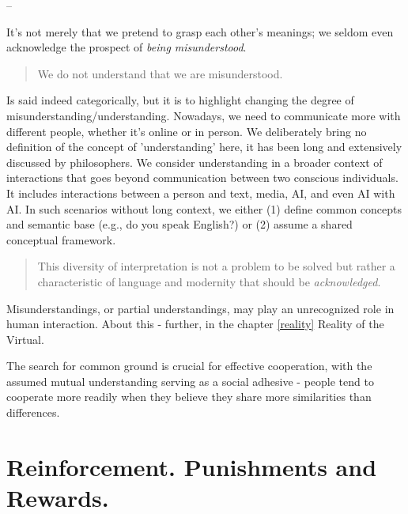 \documentclass[11pt,a4]{article}
\begin{document}
        --

        \par
        It's not merely that we pretend to grasp each other's meanings; we seldom even acknowledge
        the prospect of \textit{being misunderstood}.

        \begin{quote}
            We do not understand that we are misunderstood.
        \end{quote}

        Is said indeed categorically, but it is to highlight changing the degree
        of misunderstanding/understanding. Nowadays, we need to communicate more with different people,
        whether it's online or in person. We deliberately bring no definition of the concept
        of 'understanding' here, it has been long and extensively
        discussed by philosophers.
        We consider understanding in a broader context of interactions
        that goes beyond communication between two conscious individuals. It includes interactions
        between a person and text, media, AI,
        and even AI with AI. In such scenarios
        without long context, we either (1) define common concepts and semantic
        base (e.g., do you speak English?) or (2) assume a
        shared conceptual framework.

        \begin{quote}
            This diversity of interpretation is not a problem to be solved
            but rather a characteristic of language and modernity that
            should be \textit{acknowledged}.
        \end{quote}


        Misunderstandings, or partial understandings, may play an
        unrecognized role in human interaction.
        About this - further, in the chapter \ref{reality} Reality of the Virtual.

        The search for common ground is crucial for
        effective cooperation, with the assumed mutual understanding
        serving as a social adhesive - people tend to cooperate more readily
        when they believe they share more similarities than differences.









\newpage
\section{Reinforcement. Punishments and Rewards.}
\end{document}
